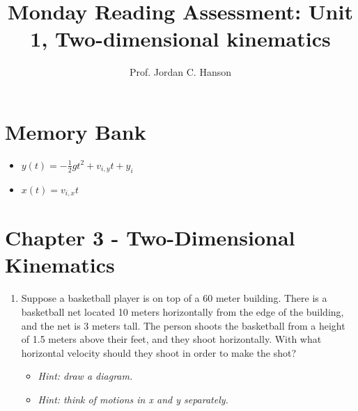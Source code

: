 \documentclass{article}
\begin{document}
\title{Monday Reading Assessment: Unit 1, Two-dimensional kinematics}
\author{Prof. Jordan C. Hanson}

\maketitle

\section{Memory Bank}

\begin{itemize}
\item $y(t) = -\frac{1}{2}g t^2 + v_{i,y} t + y_i$
\item $x(t) = v_{i,x} t$
\end{itemize}

\section{Chapter 3 - Two-Dimensional Kinematics}

\begin{enumerate}
\item Suppose a basketball player is on top of a 60 meter building.  There is a basketball net located 10 meters horizontally from the edge of the building, and the net is 3 meters tall.  The person shoots the basketball from a height of 1.5 meters above their feet, and they shoot horizontally.  With what horizontal velocity should they shoot in order to make the shot?
\begin{itemize}
\item \textit{Hint: draw a diagram.}
\item \textit{Hint: think of motions in x and y separately.}
\end{itemize}
\end{enumerate}
\end{document}
